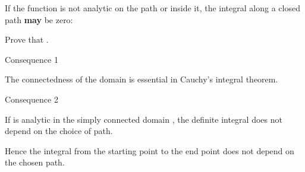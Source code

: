 \begin{EMexample}{}

If the function is not analytic on the path or inside it, the integral along a closed path \textbf{may} be zero:

\end{EMexample}

\begin{EMexercise}{}

Prove that .

\end{EMexercise}

\begin{EMremark}{Consequence 1}

The connectedness of the domain is essential in Cauchy's integral theorem.

\end{EMremark}

\begin{EMremark}{Consequence 2}

If  is analytic in the simply connected domain , the definite integral does not depend on the choice of path.

\end{EMremark}


Hence the integral from the starting point to the end point does not depend on the chosen path.







